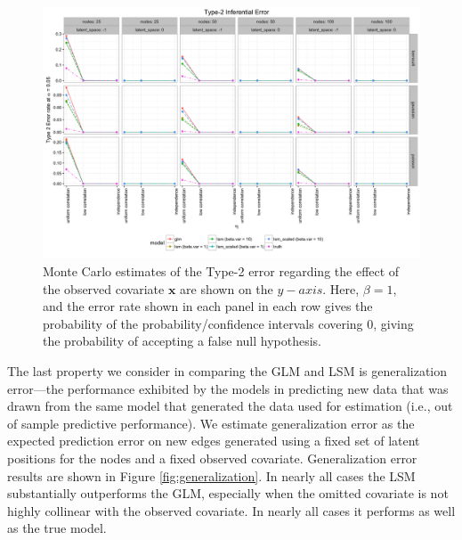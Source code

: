 \documentclass[11pt]{article}
\begin{document}
\begin{figure}
\includegraphics[width=\textwidth]{figures/inference_type_2.png}
\caption{Monte Carlo estimates of the Type-2 error regarding the effect of the observed covariate $\mathbf{x}$ are shown on the $y-axis$. Here, $\beta = 1$, and the error rate shown in each panel in each row gives the probability of the probability/confidence intervals covering $0$, giving the probability of accepting a false null hypothesis. \label{fig:inference_type_2}}
\end{figure}

The last property we consider in comparing the GLM and LSM is generalization error---the performance exhibited by the models in predicting new data that was drawn from the same model that generated the data used for estimation (i.e., out of sample predictive performance). We estimate generalization error as the expected prediction error on new edges generated using a fixed set of latent positions for the nodes and a fixed observed covariate. Generalization error results are shown in Figure \ref{fig:generalization}. In nearly all cases the LSM substantially outperforms the GLM, especially when the omitted covariate is not highly collinear with the observed covariate. In nearly all cases it performs as well as the true model. 
\end{document}
